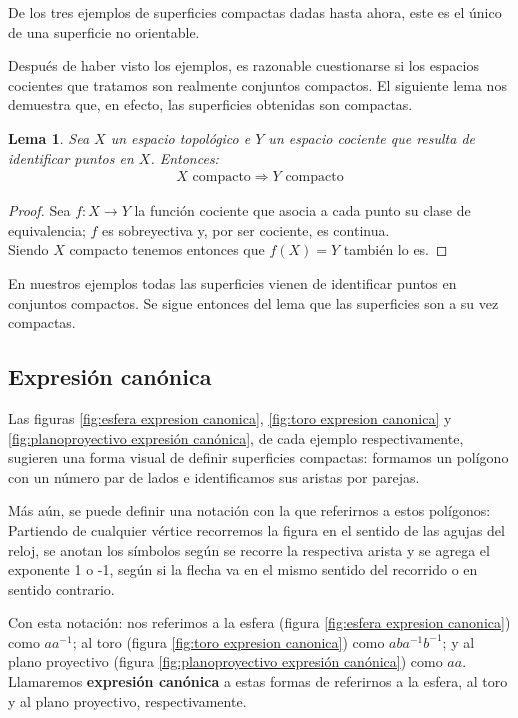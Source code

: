 \documentclass[a4paper,11pt,spanish, twoside, leqno]{tfg-uam}
\newtheorem{lema}[teor]{Lema}
\theoremstyle{definition}
\begin{document}
De los tres ejemplos de superficies compactas dadas hasta ahora, este es el único de una superficie no orientable. 

Después de haber visto los ejemplos, es razonable cuestionarse si los espacios cocientes que tratamos son realmente conjuntos compactos. El siguiente lema nos demuestra que, en efecto, las superficies obtenidas son compactas.

\begin{lema}\label{lema:compacidadDePoligonos}
Sea $X$ un espacio topológico e $Y$  un espacio cociente que resulta de identificar puntos en $X$. Entonces:
\begin{align*}
	\text{$X$ compacto}\Rightarrow\text{$Y$ compacto}
\end{align*}
\end{lema}

\begin{proof}
Sea $f:X\longrightarrow Y$ la función cociente que asocia a cada punto su clase de equivalencia; $f$ es sobreyectiva y, por ser cociente, es continua.\\
Siendo $X$ compacto tenemos entonces que $f(X)=Y$ también lo es.
\end{proof}

En nuestros ejemplos todas las superficies vienen de identificar puntos en conjuntos compactos. Se sigue entonces del lema que las superficies son a su vez compactas.


\subsection{Expresión canónica}
\label{subsec:expcanonica}

Las figuras \ref{fig:esfera expresion canonica}, \ref{fig:toro expresion canonica} y \ref{fig:planoproyectivo expresión canónica}, de cada ejemplo respectivamente, sugieren una forma visual de definir superficies compactas: formamos un polígono con un número par de lados e identificamos sus aristas por parejas. 

Más aún, se puede definir una notación con la que referirnos a estos polígonos: \\
Partiendo de cualquier vértice recorremos la figura en el sentido de las agujas del reloj, se anotan los símbolos según se recorre la respectiva arista y se agrega el exponente 1 o -1, según si la flecha va en el mismo sentido del recorrido o en sentido contrario.

Con esta notación: nos referimos  a la esfera (figura \ref{fig:esfera expresion canonica}) como $ aa^{-1} $; al toro (figura \ref{fig:toro expresion canonica})  como $ aba^{-1}b^{-1} $; y al plano proyectivo (figura \ref{fig:planoproyectivo expresión canónica}) como $ aa $. Llamaremos \textbf{expresión canónica} a estas formas de referirnos a la esfera, al toro y al plano proyectivo, respectivamente.
\end{document}
